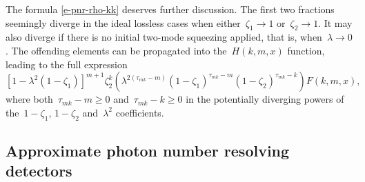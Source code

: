 \documentclass{optica-article}
\begin{document}
The formula \eqref{e-pnr-rho-kk} deserves further discussion. The first two fractions seemingly diverge in the ideal lossless cases when either~${\zeta_{1} \to 1}$ or~${\zeta_{2} \to 1}$. It may also diverge if there is no initial two-mode squeezing applied, that is, when~${\lambda \to 0}$. The offending elements can be propagated into the~$H(k, m, x)$ function, leading to the full expression
%
\begin{equation}
  { [ 1 - \lambda^{2} (1 - \zeta_{1}) ]^{m + 1} }
  { \zeta_{2}^{k} }
  \left(
    \lambda^{2 (\tau_{mk} - m)}
    (1 - \zeta_{1})^{\tau_{mk} - m}
    (1 - \zeta_{2})^{\tau_{mk} - k}
  \right)
  F (k, m, x),
\end{equation}
%
where both~${\tau_{mk} - m \geq 0}$ and~${\tau_{mk} - k \geq 0}$ in the potentially diverging powers of the~${1 - \zeta_{1}}$, ${1 - \zeta_{2}}$ and~$\lambda^{2}$ coefficients.

\subsection*{Approximate photon number resolving detectors}
\end{document}
